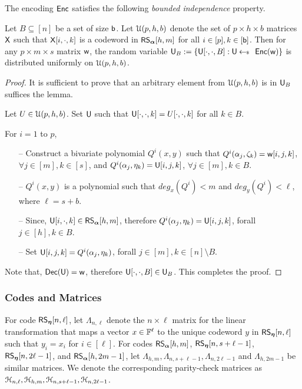 The encoding $\enc$ satisfies the following {\em bounded independence} property. %
\begin{lemma}\label{lem:boundedindependence}
	Let $B\subseteq [n]$ be a set of size $\bi$. Let $\mc{U}(p,h,b)$ denote the set of $p\times h\times b$ matrices $\matx$ such that $\matx[i,\cdot,k]$ is a codeword in $\rsc{\alpha}{h,m}$ for all $i\in [p],k\in [\bi]$. Then for any $p\times m\times s$ matrix $\wit$, the random variable $\ewit_B := \{\ewit[\cdot,\cdot,B]: \ewit\sample \enc(\wit)\}$ is distributed uniformly on $\mc{U}(p,h,b)$.
\end{lemma}

\begin{proof}
It is sufficient to prove that an arbitrary element from $\mc{U}(p,h,b)$ is in $\ewit_B$ suffices the lemma.
	
Let $U\in\mc{U}(p,h,b)$. Set $\ewit$ such that $\ewit[\cdot, \cdot, k] = U[\cdot, \cdot, k]$ for all $k\in B$.
	
For $i=1$ to $p$,
	\begin{itemize}
		\item[--] Construct a bivariate polynomial $Q^i(x,y)$ such that $Q^i(\alpha_j, \zeta_k) = \wit[i,j,k]$, $\forall j\in[m], k\in[s]$, and $Q^i(\alpha_j, \eta_k) = \ewit[i,j,k]$, $\forall j\in[m], k\in B$. 
		\item[--] $Q^i(x,y)$ is a polynomial such that $deg_x(Q^i) < m$ and $deg_y(Q^i) < \ell$, where $\ell = s + b$.
		\item[--] Since, $\ewit[i,\cdot,k] \in \rsc{\alpha}{h,m}$, therefore $Q^i(\alpha_j,\eta_k) = \ewit[i,j,k]$, forall $j\in[h], k\in B$.
		\item[--] Set $\ewit[i,j,k] = Q^i(\alpha_j, \eta_k)$, forall $j\in[m], k\in [n]\setminus B$. 
	\end{itemize}
	Note that, $\dec(\ewit) = \wit$, therefore $\ewit[\cdot, \cdot, B]\in \ewit_B$.
	This completes the proof.
\end{proof}

\subsubsection{Codes and Matrices}\label{subsec:codesandmatrices}
For code $\rsc{\eta}{n,\ell}$, let $\Lambda_{n,\ell}$ denote the $n\times \ell$ matrix for the linear transformation that maps a vector $x\in \FF^\ell$ to the unique codeword $y$ in  $\rsc{\eta}{n,\ell}$ such that $y_i=x_i$ for $i\in [\ell]$. For codes  $\rsc{\alpha}{h,m}$, $\rsc{\eta}{n,s+\ell-1}$, $\rsc{\eta}{n,2\ell-1}$, and $\rsc{\alpha}{h,2m-1}$, let
$\Lambda_{h,m},\Lambda_{n,s+\ell-1},\Lambda_{n,2\ell-1}$ and $\Lambda_{h,2m-1}$ be similar matrices. We denote the corresponding parity-check matrices as $\mc{H}_{n,\ell},\mc{H}_{h,m},\mc{H}_{n,s+\ell-1},\mc{H}_{n,2\ell-1}$. 

